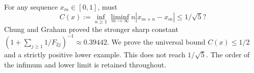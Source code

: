 For any sequence $x_m\in[0,1]$, must
\[C(x):=\inf_{n\ge1}\liminf_{m\to\infty}n|x_{m+n}-x_m|\le1/\sqrt5?\]
Chung and Graham proved the stronger sharp constant $(1+\sum_{j\ge1}1/F_{2j})^{-1}\approx0.39442$. We prove the universal bound $C(x)\le1/2$ and a strictly positive lower example. This does not reach $1/\sqrt5$. The order of the infimum and lower limit is retained throughout.
